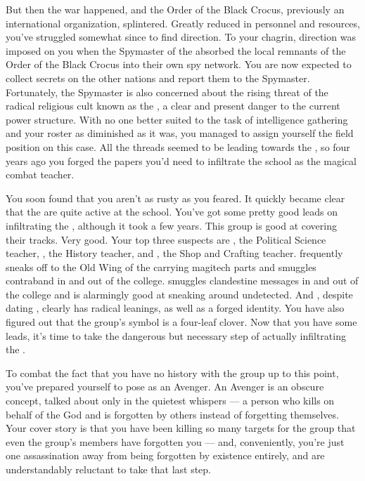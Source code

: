 \documentclass[char]{GL2020}
\begin{document}
But then the war happened, and the Order of the Black Crocus, previously an international organization, splintered. Greatly reduced in personnel and resources, you've struggled somewhat since to find direction. To your chagrin, direction was imposed on you when the Spymaster of the \pFarm{} absorbed the local remnants of the Order of the Black Crocus into their own spy network. You are now expected to collect secrets on the other nations and report them to the Spymaster. Fortunately, the Spymaster is also concerned about the rising threat of the radical religious cult known as the \pGoaties{}, a clear and present danger to the current power structure. With no one better suited to the task of intelligence gathering and your roster as diminished as it was, you managed to assign yourself the field position on this case. All the threads seemed to be leading towards the \pSchool{}, so four years ago you forged the papers you'd need to infiltrate the school as the magical combat teacher.

You soon found that you aren't as rusty as you feared. It quickly became clear that the \pGoaties{} are quite active at the school. You've got some pretty good leads on infiltrating the \pGoaties{}, although it took a few years. This group is good at covering their tracks. Very good. Your top three suspects are \cChupInventor{\full}, the Political Science teacher, \cHistory{\full}, the History teacher, and \cPirate{\full}, the Shop and Crafting teacher. \cChupInventor{} frequently sneaks off to the Old Wing of the \pSc{} carrying magitech parts and smuggles contraband in and out of the college. \cHistory{} smuggles clandestine messages in and out of the college and is alarmingly good at sneaking around undetected. And \cPirate{}, despite dating \cPrince{\full}, clearly has radical leanings, as well as a forged identity. You have also figured out that the group's symbol is a four-leaf clover. Now that you have some leads, it's time to take the dangerous but necessary step of actually infiltrating the \pGoaties{}.

To combat the fact that you have no history with the group up to this point, you've prepared yourself to pose as an Avenger. An Avenger is an obscure concept, talked about only in the quietest whispers — a person who kills on behalf of the God \cGenesis{} and is forgotten by others instead of forgetting themselves. Your cover story is that you have been killing so many targets for the group that even the group's members have forgotten you — and, conveniently, you're just one assassination away from being forgotten by existence entirely, and are understandably reluctant to take that last step.
\end{document}
